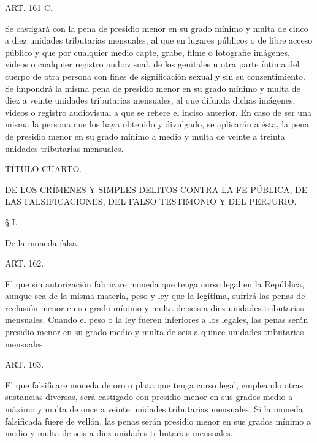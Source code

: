     ART. 161-C.

    Se castigará con la pena de presidio menor en su grado mínimo y multa de cinco a diez unidades tributarias mensuales, al que en lugares públicos o de libre acceso público y que por cualquier medio capte, grabe, filme o fotografíe imágenes, videos o cualquier registro audiovisual, de los genitales u otra parte íntima del cuerpo de otra persona con fines de significación sexual y sin su consentimiento.
    Se impondrá la misma pena de presidio menor en su grado mínimo y multa de diez a veinte unidades tributarias mensuales, al que difunda dichas imágenes, videos o registro audiovisual a que se refiere el inciso anterior.
    En caso de ser una misma la persona que los haya obtenido y divulgado, se aplicarán a ésta, la pena de presidio menor en su grado mínimo a medio y multa de veinte a treinta unidades tributarias mensuales.




    TÍTULO CUARTO.

DE LOS CRÍMENES Y SIMPLES DELITOS CONTRA LA FE PÚBLICA, DE LAS FALSIFICACIONES, DEL FALSO TESTIMONIO Y DEL PERJURIO.





    § I.

    De la moneda falsa.





    ART. 162.

    El que sin autorización fabricare moneda que tenga curso legal en la República, aunque sea de la misma materia, peso y ley que la legítima, sufrirá las penas de reclusión menor en su grado mínimo y multa de seis a diez unidades tributarias mensuales.
    Cuando el peso o la ley fueren inferiores a los legales, las penas serán presidio menor en su grado medio y multa de seis a quince unidades tributarias mensuales.






    ART. 163.

    El que falsificare moneda de oro o plata que tenga curso legal, empleando otras sustancias diversas, será castigado con presidio menor en sus grados medio a máximo y multa de once a veinte unidades tributarias mensuales.
    Si la moneda falsificada fuere de vellón, las penas serán presidio menor en sus grados mínimo a medio y multa de seis a diez unidades tributarias mensuales.






